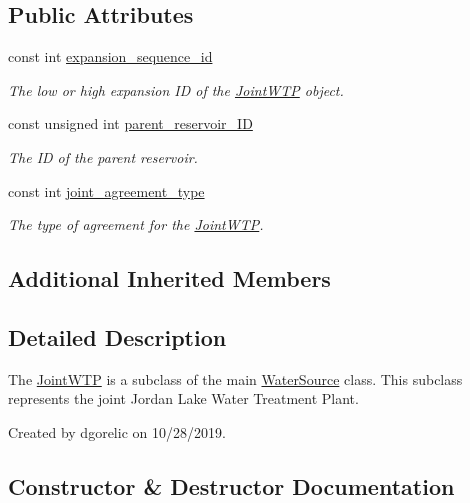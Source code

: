 \subsection*{Public Attributes}
\begin{DoxyCompactItemize}
\item 
const int \mbox{\hyperlink{classJointWTP_a0e10a7f7ade04d5f3572f185de1b8653}{expansion\+\_\+sequence\+\_\+id}}
\begin{DoxyCompactList}\small\item\em The low or high expansion ID of the \mbox{\hyperlink{classJointWTP}{Joint\+W\+TP}} object. \end{DoxyCompactList}\item 
const unsigned int \mbox{\hyperlink{classJointWTP_aa5830cb4d3013a004b7168f4dbf475eb}{parent\+\_\+reservoir\+\_\+\+ID}}
\begin{DoxyCompactList}\small\item\em The ID of the parent reservoir. \end{DoxyCompactList}\item 
const int \mbox{\hyperlink{classJointWTP_ac5663480c912b1b7cfdfb976b4fa3cec}{joint\+\_\+agreement\+\_\+type}}
\begin{DoxyCompactList}\small\item\em The type of agreement for the \mbox{\hyperlink{classJointWTP}{Joint\+W\+TP}}. \end{DoxyCompactList}\end{DoxyCompactItemize}
\subsection*{Additional Inherited Members}


\subsection{Detailed Description}
The {\ttfamily \mbox{\hyperlink{classJointWTP}{Joint\+W\+TP}}} is a subclass of the main {\ttfamily \mbox{\hyperlink{classWaterSource}{Water\+Source}}} class. This subclass represents the joint Jordan Lake Water Treatment Plant. 

Created by dgorelic on 10/28/2019. 

\subsection{Constructor \& Destructor Documentation}
\mbox{\label{classJointWTP_a1aeeff203eb631ca3bfcf407ab0bbd4f}} 
